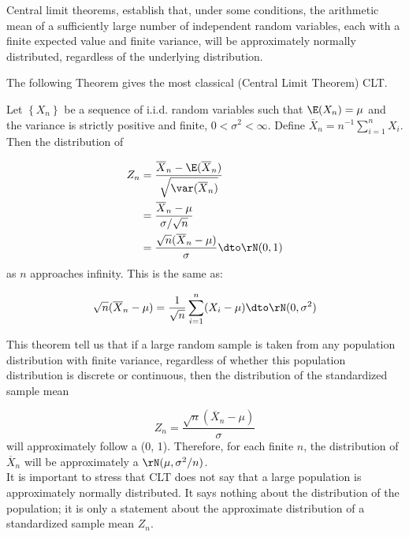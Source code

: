 \documentclass[english,12pt]{book}\usepackage[]{graphicx}\usepackage[]{xcolor}
\begin{document}
Central limit theorems, establish that, under some conditions, the arithmetic mean of a sufficiently large number of independent random variables, each with a finite expected value and finite variance, will be approximately normally distributed, regardless of the underlying distribution. 

The following Theorem gives the most classical (Central Limit Theorem) CLT. 


\begin{theorem}\label{theorem:LL_CLT_U}
Let $\left\lbrace X_n \right\rbrace$ be a sequence of i.i.d. random variables such that $\E(X_n) = \mu$ and the variance is strictly positive and finite, $0 < \sigma^2 < \infty$. Define $\overline{X}_n = n^{-1}\sum_{i = 1}^nX_i$. Then the distribution of

\begin{equation*}
  \begin{aligned}
      Z_n & = \frac{\overline{X}_n  - \E(\overline{X}_n)}{\sqrt{\var(\overline{X}_n)}} \\
          & = \frac{\overline{X}_n - \mu}{\sigma / \sqrt{n}} \\
      & = \frac{\sqrt{n}(\overline{X}_n - \mu)}{\sigma} \dto \rN(0, 1)
  \end{aligned}
\end{equation*}
%
as $n$ approaches infinity. This is the same as:
 
 
 \begin{equation*}
  \sqrt{n}(\overline{X}_n - \mu) = \frac{1}{\sqrt{n}}\sum_{i = 1}^n(X_i - \mu)\dto \rN(0, \sigma^2)
 \end{equation*}
\end{theorem}

This theorem tell us that if a large random sample is taken from any population distribution with finite variance, regardless of whether this population distribution is discrete or continuous, then the distribution of the standardized sample mean

\begin{equation*}
Z_n = \frac{\sqrt{n}(\overline{X}_n - \mu)}{\sigma}
\end{equation*}
%
will approximately follow a \rN(0, 1). Therefore, for each finite $n$, the distribution of $\overline{X}_n$ will be approximately a $\rN(\mu, \sigma^2/n)$.\\

It is important to stress that CLT does not say that a large population is approximately normally distributed. It says nothing about the distribution of the population; it is only a statement about the approximate distribution of a standardized sample mean $Z_n$. 
\end{document}
